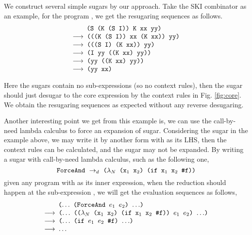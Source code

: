 We construct several simple sugars by our approach. Take the SKI combinator as an example, for the program , we get the resugaring sequences as follows.
\[
	\begin{array}{l}
		\quad\;\;\Code{ (S (K (S I)) K xx yy)}\\
	\OneStep{ \Code{ (((K (S I)) xx (K xx)) yy)}}\\
	\OneStep{ \Code{ (((S I) (K xx)) yy)}}\\
	\OneStep{ \Code{ (I yy ((K xx) yy))}}\\
	\OneStep{ \Code{ (yy ((K xx) yy))}}\\
	\OneStep{ \Code{ (yy xx)}}\\
	\end{array}
\]




Here the sugars contain no sub-expressions (so no context rules), then the sugar should just desugar to the core expression by the context rules in Fig. \ref{fig:core}.
We obtain the resugaring sequences as expected without any reverse desugaring.

Another interesting point we get from this example is, we can use the call-by-need lambda calculus to force an expansion of sugar. Considering the sugar  in the example above, we may write it by another form with  as its LHS, then the context rules can be calculated, and the sugar may not be expanded. By writing a sugar with call-by-need lambda calculus, such as the following one,
\[
\texttt{ForceAnd} ~\rightarrow_d~ \texttt{($\lambda_N$ ($\mbox{\tt x}_1$ $\mbox{\tt x}_2$) (if $\mbox{\tt x}_1$ $\mbox{\tt x}_2$ \#f))}
\]
given any program with  as its inner expression, when the reduction should happen at the sub-expression , we will get the evaluation sequences as follows,
\[
	\begin{array}{l}
		\quad\;\;\Code{ ($\ldots$ (ForceAnd $e_1$ $e_2$) $\ldots$)}\\
	\OneStep{ \Code{ ($\ldots$ (($\lambda_N$ ($\m{x}_1$ $\m{x}_2$) (if $\m{x}_1$ $\m{x}_2$ \false)) $e_1$ $e_2$) $\ldots$)}}\\
	\OneStep{ \Code{ ($\ldots$ (if $e_1$ $e_2$ \false) $\ldots$)}}\\
	\OneStep{ \Code{ $\ldots$}}\\
	\end{array}
\]
